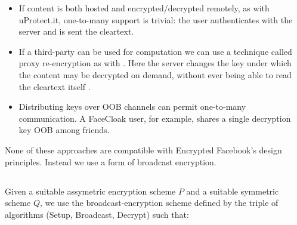 \begin{itemize}

    \item If content is both hosted and encrypted/decrypted remotely, as with uProtect.it, one-to-many support is trivial: the user authenticates with the server and is sent the cleartext.
    
    \item If a third-party can be used for computation we can use a technique called proxy re-encryption as with \cite{flybynight}. Here the server changes the key under which the content may be decrypted on demand, without ever being able to read the cleartext itself \cite{proxy}.
    
    \item Distributing keys over \ac{OOB} channels can permit one-to-many communication. A FaceCloak user, for example, shares a single decryption key \ac{OOB} among friends.

\end{itemize}

None of these approaches are compatible with Encrypted Facebook's design principles. Instead we use a form of broadcast encryption.


\subsection{}
    
    Given a suitable assymetric encryption scheme $P$ and a suitable symmetric scheme $Q$, we use the broadcast-encryption scheme defined by the triple of algorithms {\sc (Setup, Broadcast, Decrypt)} such that:
    
